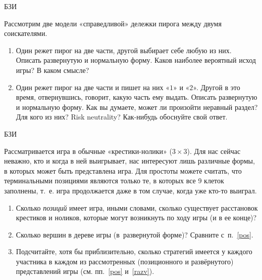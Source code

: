 \begin{problem}
\begin{source}
БЗИ
\end{source} Рассмотрим две модели
«справедливой» дележки пирога между двумя соискателями.

\begin{enumerate}

\item Один режет пирог на две части, другой выбирает себе
любую из них. Описать развернутую и нормальную форму. Каков
наиболее вероятный исход игры? {\red В каком смысле?}

\item Один режет пирог на две части и пишет на них «$1$»
и «$2$». Другой в это время, отвернувшись, говорит, какую
часть ему выдать. Описать развернутую и нормальную форму.
Как вы думаете, может ли произойти неравный раздел? {\red Для кого из них?  Risk neutrality?}
Как-нибудь обоснуйте свой ответ.

\end{enumerate}

\begin{sol}
\end{sol}
\end{problem}




\begin{problem}
\begin{source}
БЗИ
\end{source} Рассматривается игра в
обычные «крестики-нолики» (${3\times 3}$). Для нас сейчас неважно,
кто и когда в ней
выигрывает, нас интересуют лишь различные формы, в которых
может быть представлена игра. Для простоты можете считать,
что терминальными позициями являются только те, в которых
все 9 клеток заполнены, т.~е. игра продолжается даже в том случае, когда
уже кто-то выиграл.

\begin{enumerate}

\item\label{pos} Сколько {\it позиций} имеет игра, иными
словами, сколько существует расстановок крестиков и
ноликов, которые могут возникнуть по ходу игры (и в ее
конце)?

\item\label{razv} Сколько вершин в дереве игры
(в~развернутой форме)?  Сравните с~п.~\ref{pos}.

\item Подсчитайте, хотя бы приблизительно, сколько
стратегий имеется у каждого участника в каждом из
рассмотренных (позиционного и развёрнутого) представлений игры (см. пп.~\ref{pos}
и~\ref{razv}).

\end{enumerate}






\begin{sol}

\end{sol}
\end{problem}




